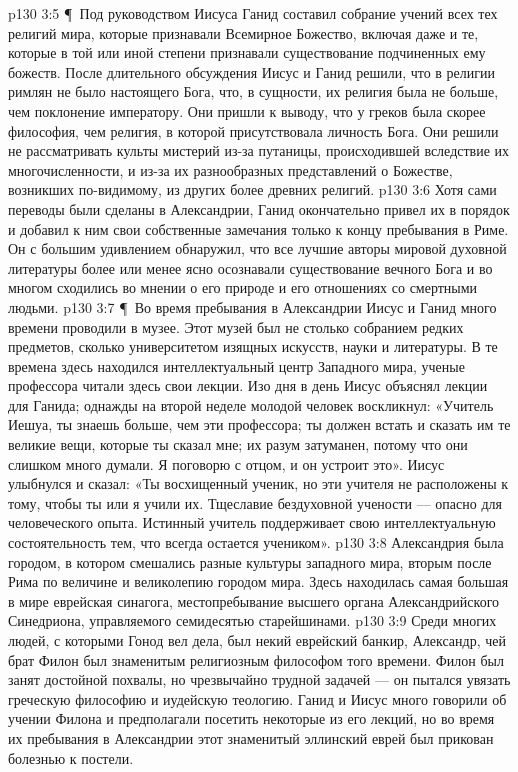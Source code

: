 \vs p130 3:5 \P\ Под руководством Иисуса Ганид составил собрание учений всех тех религий мира, которые признавали Всемирное Божество, включая даже и те, которые в той или иной степени признавали существование подчиненных ему божеств. После длительного обсуждения Иисус и Ганид решили, что в религии римлян не было настоящего Бога, что, в сущности, их религия была не больше, чем поклонение императору. Они пришли к выводу, что у греков была скорее философия, чем религия, в которой присутствовала личность Бога. Они решили не рассматривать культы мистерий из\hyp{}за путаницы, происходившей вследствие их многочисленности, и из\hyp{}за их разнообразных представлений о Божестве, возникших по\hyp{}видимому, из других более древних религий.
\vs p130 3:6 Хотя сами переводы были сделаны в Александрии, Ганид окончательно привел их в порядок и добавил к ним свои собственные замечания только к концу пребывания в Риме. Он с большим удивлением обнаружил, что все лучшие авторы мировой духовной литературы более или менее ясно осознавали существование вечного Бога и во многом сходились во мнении о его природе и его отношениях со смертными людьми.
\vs p130 3:7 \P\ Во время пребывания в Александрии Иисус и Ганид много времени проводили в музее. Этот музей был не столько собранием редких предметов, сколько университетом изящных искусств, науки и литературы. В те времена здесь находился интеллектуальный центр Западного мира, ученые профессора читали здесь свои лекции. Изо дня в день Иисус объяснял лекции для Ганида; однажды на второй неделе молодой человек воскликнул: «Учитель Иешуа, ты знаешь больше, чем эти профессора; ты должен встать и сказать им те великие вещи, которые ты сказал мне; их разум затуманен, потому что они слишком много думали. Я поговорю с отцом, и он устроит это». Иисус улыбнулся и сказал: «Ты восхищенный ученик, но эти учителя не расположены к тому, чтобы ты или я учили их. Тщеславие бездуховной учености --- опасно для человеческого опыта. Истинный учитель поддерживает свою интеллектуальную состоятельность тем, что всегда остается учеником».
\vs p130 3:8 Александрия была городом, в котором смешались разные культуры западного мира, вторым после Рима по величине и великолепию городом мира. Здесь находилась самая большая в мире еврейская синагога, местопребывание высшего органа Александрийского Синедриона, управляемого семидесятью старейшинами.
\vs p130 3:9 Среди многих людей, с которыми Гонод вел дела, был некий еврейский банкир, Александр, чей брат Филон был знаменитым религиозным философом того времени. Филон был занят достойной похвалы, но чрезвычайно трудной задачей --- он пытался увязать греческую философию и иудейскую теологию. Ганид и Иисус много говорили об учении Филона и предполагали посетить некоторые из его лекций, но во время их пребывания в Александрии этот знаменитый эллинский еврей был прикован болезнью к постели.
